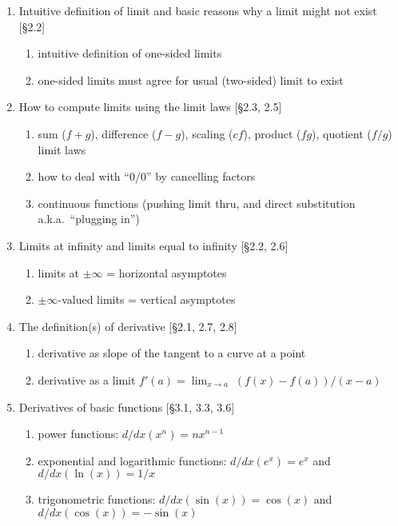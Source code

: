 \documentclass[11pt]{article}
\begin{document}
\begin{enumerate}
\item Intuitive definition of limit and basic reasons why a limit might not exist [\S2.2]
\begin{enumerate}
\item intuitive definition of one-sided limits
\item one-sided limits must agree for usual (two-sided) limit to exist
\end{enumerate}

\item How to compute limits using the limit laws [\S2.3, 2.5]
\begin{enumerate}
\item sum ($f+g$), difference ($f-g$), scaling ($cf$), product ($fg$), quotient ($f/g$) limit laws
\item how to deal with ``$0/0$'' by cancelling factors
\item continuous functions (pushing limit thru, and direct substitution a.k.a.~``plugging in'')
\end{enumerate}

\item Limits at infinity and limits equal to infinity [\S2.2, 2.6]
\begin{enumerate}
\item limits at $\pm \infty$ = horizontal asymptotes
\item $\pm \infty$-valued limits = vertical asymptotes
\end{enumerate}

\item The definition(s) of derivative [\S2.1, 2.7, 2.8]
\begin{enumerate}
\item derivative as slope of the tangent to a curve at a point
\item derivative as a limit $f'(a) = \lim_{x \to a} \; (f(x)-f(a))/(x-a)$
\end{enumerate}

\item Derivatives of basic functions [\S 3.1, 3.3, 3.6]
\begin{enumerate}
\item power functions: $d/dx (x^n) = n x^{n-1}$
\item exponential and logarithmic functions: $d/dx(e^x) = e^x$ and $d/dx(\ln(x)) = 1/x$
\item trigonometric functions: $d/dx(\sin(x)) = \cos(x)$ and $d/dx(\cos(x)) = -\sin(x)$
\end{enumerate}


\end{enumerate}
\end{document}
